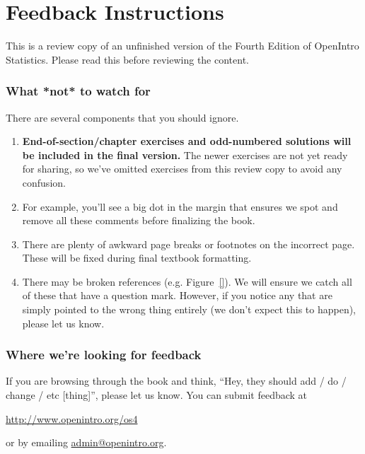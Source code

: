 \chapter*{Feedback Instructions}

This is a review copy of an unfinished version of the
Fourth Edition of OpenIntro Statistics.
Please read this before reviewing the content.


\subsection*{What *not* to watch for}

\noindent%
There are several components that you should ignore.
\begin{enumerate}
\setlength{\itemsep}{0mm}
\item
    \textbf{End-of-section/chapter exercises
    and odd-numbered solutions will be included
    in the final version.}
    The newer exercises are not yet ready for sharing,
    so we've omitted exercises from this review copy
    to avoid any confusion.
\item
    For example, you'll see a big dot in the margin that
    ensures we spot and remove all these comments before
    finalizing the book.
\item
    There are plenty of awkward page breaks or footnotes
    on the incorrect page.
    These will be fixed during final textbook formatting.
\item
    There may be broken references (e.g. Figure~\ref{}).
    We will ensure we catch all of these that have
    a question mark.
    However, if you notice any that are simply pointed
    to the wrong thing entirely (we don't expect this
    to happen), please let us know.
\end{enumerate}


\subsection*{Where we're looking for feedback}

\noindent%
If you are browsing through the book and think,
``Hey, they should add / do / change / etc [thing]'',
please let us know.
You can submit feedback at
\begin{center}
\url{http://www.openintro.org/os4}
\end{center}
or by emailing \url{admin@openintro.org}. \\

